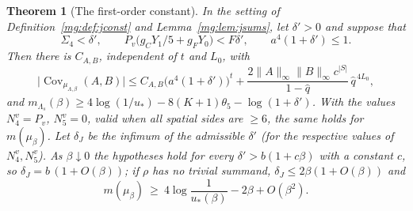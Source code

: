 \documentclass[11pt,a4paper]{article}
\newtheorem{theorem}{Theorem}[section]
\theoremstyle{definition}
\theoremstyle{remark}
\DeclareMathOperator{\Cov}{Cov}
\newcommand{\norm}[1]{\lVert #1\rVert}
\begin{document}
\begin{theorem}[The first-order constant]\label{mg:thm:junctions}
In the setting of Definition~\ref{mg:def:jconst} and Lemma~\ref{mg:lem:jsums}, let $\delta'>0$ and suppose that
\[
\Sigma_4<\delta',\qquad P_v\bigl(g_CY_1/5+g_FY_0\bigr)<F\delta',\qquad a^4(1+\delta')\le1 .
\]
Then there is $C_{A,B}$, independent of $t$ and $L_0$, with
\[
\bigl|\Cov_{\mu_{\Lambda,\beta}}(A,B)\bigr|\le C_{A,B}\bigl(a^4(1+\delta')\bigr)^t+\frac{2\norm A_\infty\norm B_\infty c^{|S|}}{1-\hat q}\,\hat q^{\,4L_0},
\]
and $m_{\Lambda_s}(\beta)\ge4\log(1/u_*)-8(K+1)\theta_5-\log(1+\delta')$. With the values $N^v_4=P_v$, $N^v_5=0$, valid
when all spatial sides are $\ge6$, the same holds for $m(\mu_\beta)$. Let $\delta_J$ be the infimum of the admissible $\delta'$ (for the respective
values of $N^v_4,N^v_5$). As $\beta\downarrow0$ the hypotheses hold for every $\delta'>b(1+c\beta)$ with a constant $c$, so
$\delta_J=b\,(1+O(\beta))$; if $\rho$ has no trivial summand, $\delta_J\le2\beta(1+O(\beta))$ and
\[
m(\mu_\beta)\ \ge\ 4\log\frac1{u_*(\beta)}-2\beta+O(\beta^2).
\]
\end{theorem}
\end{document}
